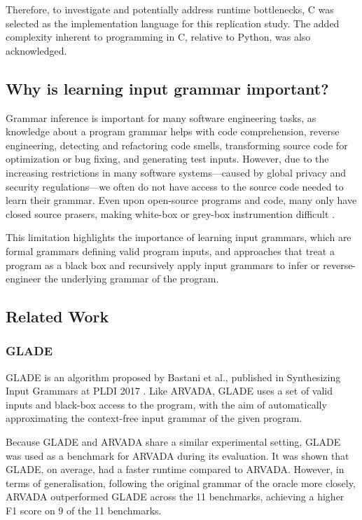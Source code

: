 \vspace{\baselineskip}

Therefore, to investigate and potentially address runtime bottlenecks, C was selected as the implementation language for this replication study. The added complexity inherent to programming in C, relative to Python, was also acknowledged.


\subsection{Why is learning input grammar important?}
Grammar inference is important for many software engineering tasks, as knowledge about a program grammar helps with code comprehension, reverse engineering, detecting and refactoring code smells, transforming source code for optimization or bug fixing, and generating test inputs\cite{arefinFastDeterministicBlackbox2024}. However, due to the increasing restrictions in many software systems—caused by global privacy and security regulations—we often do not have access to the source code needed to learn their grammar.  Even upon open-source programs and code, many only have closed source prasers, making white-box or grey-box instrumention difficult \cite{arefinFastDeterministicBlackbox2024,liIncrementalContextfreeGrammar2024}.

\vspace{\baselineskip}
This limitation highlights the importance of learning input grammars, which are formal grammars defining valid program inputs, and approaches that treat a program as a black box and recursively apply input grammars to infer or reverse-engineer the underlying grammar of the program.


\subsection{Related Work}
\subsubsection{GLADE}
GLADE is an algorithm proposed by Bastani et al., published in Synthesizing Input Grammars at PLDI 2017 \cite{bastaniSynthesizingProgramInput}. Like ARVADA, GLADE uses a set of valid inputs and black-box access to the program, with the aim of automatically approximating the context-free input grammar of the given program.

\vspace{\baselineskip}

Because GLADE and ARVADA share a similar experimental setting, GLADE was used as a benchmark for ARVADA during its evaluation. It was shown that GLADE, on average, had a faster runtime compared to ARVADA. However, in terms of generalisation, following the original grammar of the oracle more closely, ARVADA outperformed GLADE across the 11 benchmarks, achieving a higher F1 score on 9 of the 11 benchmarks.

